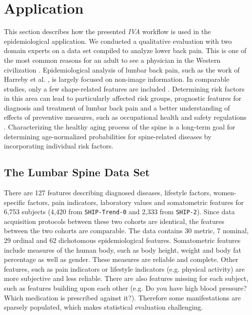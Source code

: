 \documentclass[journal]{style/vgtc} 			          %
\begin{document}
\section{Application} \label{application}
This section describes how the presented \emph{IVA} workflow is used in the epidemiological application.
%
We conducted a qualitative evaluation with two domain experts on a data set compiled to analyze lower back pain. 
%
This is one of the most common reasons for an adult to see a physician in the Western civilization \cite{Backpain}.
%
Epidemiological analysis of lumbar back pain, such as the work of Harreby et al. \cite{Harreby1996}, is largely focused on non-image information.
%
In comparable studies, only a few shape-related features are included \cite{Lang2011}.
%
%
Determining risk factors in this area can lead to particularly affected risk groups, prognostic features for diagnosis and treatment of lumbar back pain and a better understanding of effects of preventive measures, such as occupational health and safety regulations \cite{Fletcher2012}.
%
Characterizing the healthy aging process of the spine is a long-term goal for determining age-normalized probabilities for spine-related diseases by incorporating individual risk factors.
%
\subsection{The Lumbar Spine Data Set}
%
There are 127 features describing diagnosed diseases, lifestyle factors, women-specific factors, pain indicators, laboratory values and somatometric features for 6,753 subjects (4,420 from \texttt{SHIP-Trend-0} and 2,333 from \texttt{SHIP-2}).
%
Since data acquisition protocols between these two cohorts are identical, the features between the two cohorts are comparable.
%
The data contains 30 metric, 7 nominal, 29 ordinal and 62 dichotomous epidemiological features.
%
Somatometric features include measures of the human body, such as body height, weight and body fat percentage as well as gender.
%
These measures are reliable and complete.
%
Other features, such as pain indicators or lifestyle indicators (e.g. physical activity) are more subjective and less reliable.
%
There are also features missing for each subject, such as features building upon each other (e.g. Do you have high blood pressure? Which medication is prescribed against it?).
%
Therefore some manifestations are sparsely populated, which makes statistical evaluation challenging.
%
%
\end{document}
